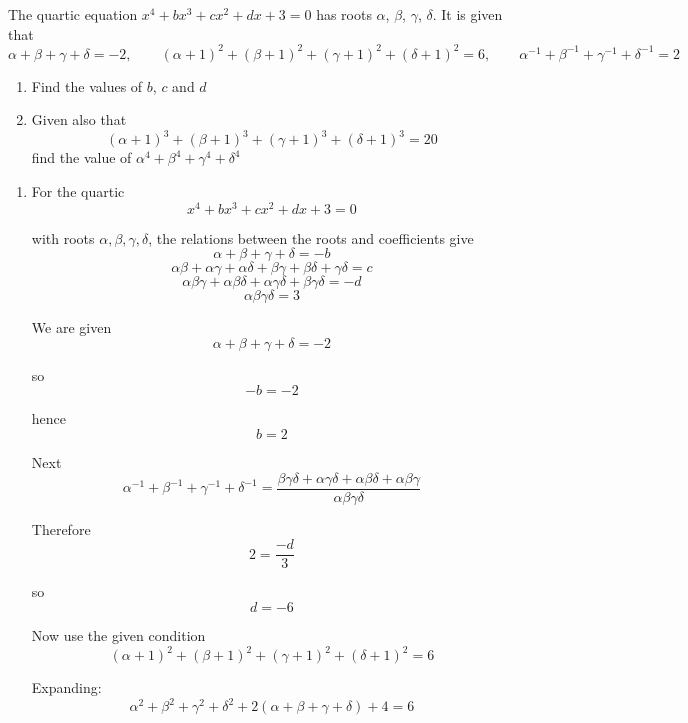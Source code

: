\documentclass[leqno]{article}
\begin{document}
\begin{enumerate}[
  label=\textbf{\arabic*.},
  leftmargin=*,
  topsep=0pt,
  partopsep=0pt,
  parsep=0pt
]
\newpage

\questionitem

The quartic equation $x^4+bx^3+cx^2+dx+3=0$ has roots $\alpha$, $\beta$, $\gamma$, $\delta$. It is given that
\[
\alpha+\beta+\gamma+\delta=-2,\qquad (\alpha+1)^2+(\beta+1)^2+(\gamma+1)^2+(\delta+1)^2=6,\qquad \alpha^{-1}+\beta^{-1}+\gamma^{-1}+\delta^{-1}=2
\]
\begin{enumerate}[label=\textbf{(\alph*)}]
  \item Find the values of $b$, $c$ and $d$  \\
  \item Given also that
  \[
  (\alpha+1)^3+(\beta+1)^3+(\gamma+1)^3+(\delta+1)^3=20
  \]
  find the value of $\alpha^4+\beta^4+\gamma^4+\delta^4$  \\
\end{enumerate}

\vspace*{10pt}

\begin{djsSolution}
\begin{enumerate}[label=\textbf{(\alph*)}]
  \item For the quartic
  \[
  x^4+bx^3+cx^2+dx+3=0
  \]

  with roots $\alpha,\beta,\gamma,\delta$, the relations between the roots and coefficients give
  \[
  \alpha+\beta+\gamma+\delta=-b
  \]
  \[
  \alpha\beta+\alpha\gamma+\alpha\delta+\beta\gamma+\beta\delta+\gamma\delta=c
  \]
  \[
  \alpha\beta\gamma+\alpha\beta\delta+\alpha\gamma\delta+\beta\gamma\delta=-d
  \]
  \[
  \alpha\beta\gamma\delta=3
  \]

  We are given
  \[
  \alpha+\beta+\gamma+\delta=-2
  \]

  so
  \[
  -b=-2
  \]

  hence
  \[
  b=2
  \]

  Next
  \[
  \alpha^{-1}+\beta^{-1}+\gamma^{-1}+\delta^{-1}
  =\frac{\beta\gamma\delta+\alpha\gamma\delta+\alpha\beta\delta+\alpha\beta\gamma}{\alpha\beta\gamma\delta}
  \]

  Therefore
  \[
  2=\frac{-d}{3}
  \]

  so
  \[
  d=-6
  \]

  Now use the given condition
  \[
  (\alpha+1)^2+(\beta+1)^2+(\gamma+1)^2+(\delta+1)^2=6
  \]

  Expanding:
  \[
  \alpha^2+\beta^2+\gamma^2+\delta^2+2(\alpha+\beta+\gamma+\delta)+4=6
  \]


\end{enumerate}
\end{djsSolution}
\end{enumerate}
\end{document}
